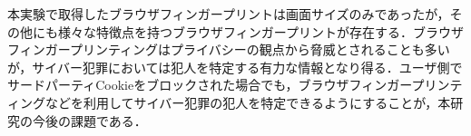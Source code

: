 \documentclass[10pt, a4paper]{jreport}
\begin{document}
本実験で取得したブラウザフィンガープリントは画面サイズのみであったが，その他にも様々な特徴点を持つブラウザフィンガープリントが存在する\cite{kind_of_fingerprints}．ブラウザフィンガープリンティングはプライバシーの観点から脅威とされることも多いが，サイバー犯罪においては犯人を特定する有力な情報となり得る．ユーザ側でサードパーティCookieをブロックされた場合でも，ブラウザフィンガープリンティングなどを利用してサイバー犯罪の犯人を特定できるようにすることが，本研究の今後の課題である．

\end{document}
